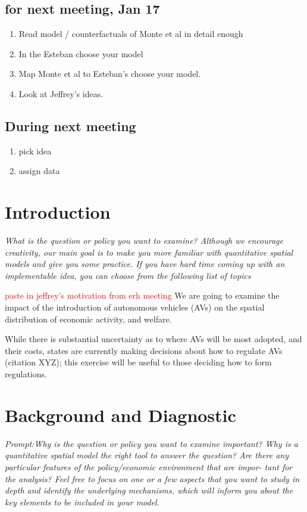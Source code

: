 \documentclass{article}
\begin{document}
\subsection{ for next meeting, Jan 17 }
\begin{enumerate}
    \item Read model / counterfactuals of Monte et al in detail enough 
    \item In the Esteban choose your model 
    \item Map Monte et al to Esteban's choose your model. 
    \item Look at Jeffrey's ideas. 
\end{enumerate}



\subsection{During next meeting}
\begin{enumerate}
    \item pick idea
    \item assign data 
\end{enumerate}


\section{Introduction}
\textit{What is the question or policy you want to examine? Although we encourage
creativity, our main goal is to make you more familiar with quantitative spatial models
and give you some practice. If you have hard time coming up with an implementable
idea, you can choose from the following list of topics}


\textcolor{red}{paste in jeffrey's motivation from erh meeting}
We are going to examine the impact of the introduction of autonomous vehicles (AVs) on the spatial distribution of economic activity, and welfare.

While there is substantial uncertainty as to where AVs will be most adopted, and their costs, states are currently making decisions about how to regulate AVs (citation XYZ); this exercise will be useful to those deciding how to form regulations.




\section{Background and Diagnostic}
\textit{Prompt:Why is the question or policy you want to examine
important? Why is a quantitative spatial model the right tool to answer the question?
Are there any particular features of the policy/economic environment that are impor-
tant for the analysis? Feel free to focus on one or a few aspects that you want to study
in depth and identify the underlying mechanisms, which will inform you about the key
elements to be included in your model.}
\end{document}
